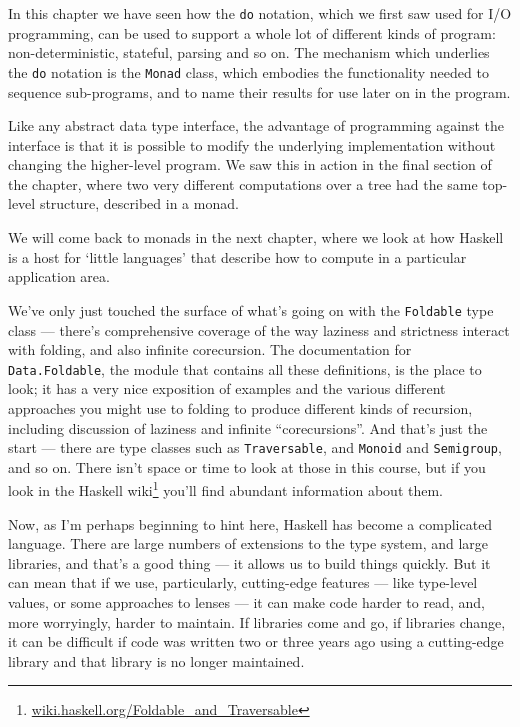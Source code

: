 \begin{summary}%
%
%

In this chapter we have seen how the \texttt{do} notation, which we first saw used for I/O programming, can be used to support a whole lot of different kinds of program: non-deterministic, stateful, parsing and so on. The mechanism which underlies the \texttt{do} notation is the \texttt{Monad} class, which embodies the functionality needed to sequence sub-programs, and to name their results for use later on in the program.

Like any abstract data type interface, the advantage of programming against the interface is that it is possible to modify the underlying implementation without changing the higher-level program. We saw this in action in the final section of the chapter, where two very different computations over a tree had the same top-level structure, described in a monad.

We will come back to monads in the next chapter, where we look at how Haskell is a host for `little languages' that describe how to compute in a particular application area.

We've only just touched the surface of what's going on with the \texttt{Foldable} type class — there's comprehensive coverage of the way laziness and strictness interact with folding, and also infinite corecursion. The documentation for \texttt{Data.Foldable}, the module that contains all these definitions, is the place to look; it has a very nice exposition of examples and the various different approaches you might use to folding to produce different kinds of recursion, including discussion of laziness and infinite ``corecursions''. And that's just the start — there are type classes such as \texttt{Traversable}, and \texttt{Monoid} and \texttt{Semigroup}, and so on. There isn't space or time to look at those in this course, but if you look in the Haskell wiki\footnote{\url{wiki.haskell.org/Foldable_and_Traversable}} you'll find abundant information about them.

Now, as I'm perhaps beginning to hint here, Haskell has become a complicated language. There are large numbers of extensions to the type system, and large libraries, and that's a good thing — it allows us to build things quickly. But it can mean that if we use, particularly, cutting-edge features — like type-level values, or some approaches to lenses — it can make code harder to read, and, more worryingly, harder to maintain. If libraries come and go, if libraries change, it can be difficult if code was written two or three years ago using a cutting-edge library and that library is no longer maintained.


\end{summary}
